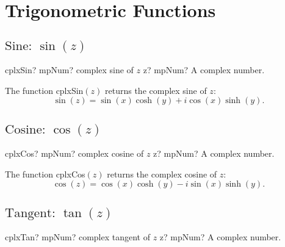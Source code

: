 \section{Trigonometric Functions}
\label{TrigonometricFunctionsCplx}


\subsection{\texorpdfstring{$\text{Sine: }\sin(z)$}{sin}}

\begin{mpFunctionsExtract}
	\mpFunctionOne
	{cplxSin? mpNum? complex sine of $z$}
	{z? mpNum? A complex number.}
\end{mpFunctionsExtract}

\vspace{0.3cm}
The function \textsf{cplxSin$(z)$} returns the complex sine of $z$: 
\begin{equation}
	\sin(z) = \sin(x) \cosh(y) + i \cos(x) \sinh(y).
\end{equation}




\newpage
\subsection{\texorpdfstring{$\text{Cosine: }\cos(z)$}{cos}}

\begin{mpFunctionsExtract}
	\mpFunctionOne
	{cplxCos? mpNum? complex cosine of $z$}
	{z? mpNum? A complex number.}
\end{mpFunctionsExtract}

\vspace{0.3cm}
The function \textsf{cplxCos$(z)$} returns the complex cosine of $z$: 
\begin{equation}
	\cos(z) = \cos(x) \cosh(y) - i \sin(x) \sinh(y).
\end{equation}





\newpage
\subsection{\texorpdfstring{$\text{Tangent: }\tan(z)$}{tan}}

\begin{mpFunctionsExtract}
	\mpFunctionOne
	{cplxTan? mpNum? complex tangent of $z$}
	{z? mpNum? A complex number.}
\end{mpFunctionsExtract}

